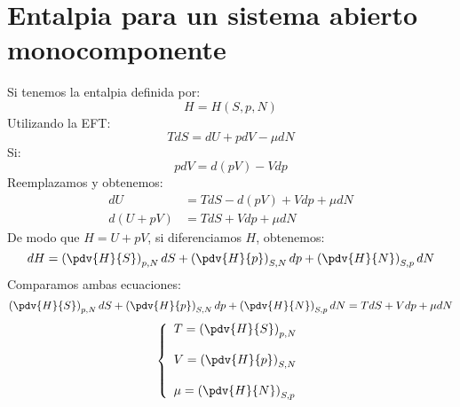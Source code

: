 \documentclass[../main]{subfiles}
\begin{document}
\section{Entalpia para un sistema abierto monocomponente}
Si tenemos la entalpia definida por:
\begin{equation}
    H=H(S,p,N)
\end{equation}
Utilizando la EFT:
\begin{equation}
    TdS=dU+pdV-\mu dN
\end{equation}
Si:
\begin{equation}
    pdV=d(pV)-Vdp
\end{equation}
Reemplazamos y obtenemos:
\begin{align}
    dU      & =TdS-d(pV)+Vdp+\mu dN \\
    d(U+pV) & =TdS+Vdp+\mu dN
\end{align}
De modo que $H=U+pV$, si diferenciamos $H$, obtenemos:
\begin{equation}
    dH=\left( \pdv{H}{S} \right)_{p,N}dS+\left( \pdv{H}{p}\right)_{S,N}dp+\left ( \pdv{H}{N} \right)_{S,p}dN
\end{equation}
Comparamos ambas ecuaciones:
\begin{equation}
    \left( \pdv{H}{S} \right)_{p,N}dS+\left( \pdv{H}{p}\right)_{S,N}dp+\left ( \pdv{H}{N} \right)_{S,p}dN=TdS+Vdp+\mu dN
\end{equation}
\begin{equation}
    \left\{
    \begin{array}{l}
        T=\displaystyle \left( \pdv{H}{S} \right)_{p,N} \\ \\
        V=\displaystyle \left( \pdv{H}{p}\right)_{S,N}  \\ \\
        \mu=\displaystyle \left ( \pdv{H}{N} \right)_{S,p}
    \end{array}
    \right.
\end{equation}
\end{document}
